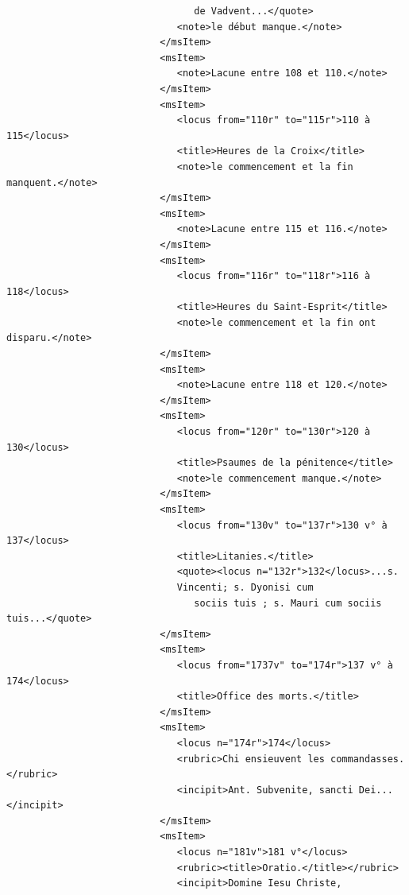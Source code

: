 \documentclass[a4paper,12pt,twoside]{book}
\begin{document}
\begin{verbatim}
                                 de Vadvent...</quote>
                              <note>le début manque.</note>
                           </msItem>
                           <msItem>
                              <note>Lacune entre 108 et 110.</note>
                           </msItem>
                           <msItem>
                              <locus from="110r" to="115r">110 à 115</locus>
                              <title>Heures de la Croix</title>
                              <note>le commencement et la fin manquent.</note>
                           </msItem>
                           <msItem>
                              <note>Lacune entre 115 et 116.</note>
                           </msItem>
                           <msItem>
                              <locus from="116r" to="118r">116 à 118</locus>
                              <title>Heures du Saint-Esprit</title>
                              <note>le commencement et la fin ont disparu.</note>
                           </msItem>
                           <msItem>
                              <note>Lacune entre 118 et 120.</note>
                           </msItem>
                           <msItem>
                              <locus from="120r" to="130r">120 à 130</locus>
                              <title>Psaumes de la pénitence</title>
                              <note>le commencement manque.</note>
                           </msItem>
                           <msItem>
                              <locus from="130v" to="137r">130 v° à 137</locus>
                              <title>Litanies.</title>
                              <quote><locus n="132r">132</locus>...s. 
                              Vincenti; s. Dyonisi cum
                                 sociis tuis ; s. Mauri cum sociis tuis...</quote>
                           </msItem>
                           <msItem>
                              <locus from="1737v" to="174r">137 v° à 174</locus>
                              <title>Office des morts.</title>
                           </msItem>
                           <msItem>
                              <locus n="174r">174</locus>
                              <rubric>Chi ensieuvent les commandasses.</rubric>
                              <incipit>Ant. Subvenite, sancti Dei...</incipit>
                           </msItem>
                           <msItem>
                              <locus n="181v">181 v°</locus>
                              <rubric><title>Oratio.</title></rubric>
                              <incipit>Domine Iesu Christe, 

\end{verbatim}
\end{document}
